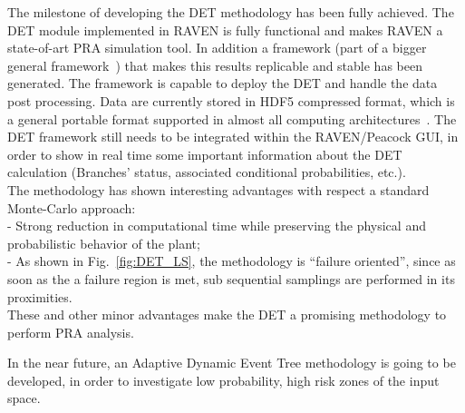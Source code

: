 \label{sec:conclusions}
The milestone of developing the DET methodology has been fully achieved. The DET module implemented in RAVEN is fully functional and makes RAVEN a state-of-art PRA simulation tool. In addition a framework (part of a bigger general framework~\cite{RAVENFY13}) that makes this results replicable and stable has been generated. The framework is capable to deploy the DET and handle the data post processing. Data are currently stored in HDF5 compressed format, which is a general portable format supported in almost all computing architectures~\cite{HDF5}. 
The DET framework still needs to be integrated within the RAVEN/Peacock GUI, in order to show in real time some important information about the DET calculation (Branches' status, associated conditional probabilities, etc.).
\\The methodology has shown interesting advantages with respect a standard Monte-Carlo approach:    
\\ - Strong reduction in computational time while preserving the physical and probabilistic behavior of the plant;
\\ - As shown in Fig.~\ref{fig:DET_LS}, the methodology is ``failure oriented'', since as soon as the a failure region is met, sub sequential samplings are performed in its proximities. 
\\These and other minor advantages make the DET a promising methodology to perform PRA analysis.

In the near future, an Adaptive Dynamic Event Tree methodology is going to be developed, in order to investigate low probability, high risk zones of the input space.
  
